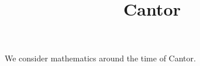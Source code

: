 \documentclass{ximera}
\title{Cantor}
\begin{document}
\begin{abstract}
\end{abstract}
\maketitle

We consider mathematics around the time of Cantor.
\end{document}
